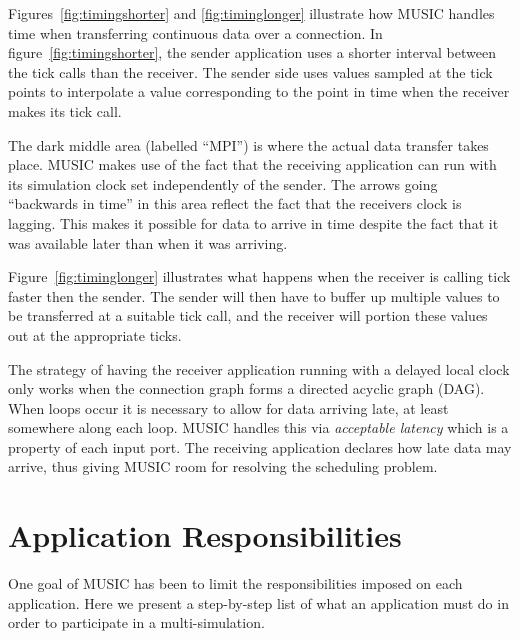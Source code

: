 \documentclass[a4paper]{report}
\begin{document}
Figures~\ref{fig:timingshorter} and \ref{fig:timinglonger} illustrate
how MUSIC handles time when transferring continuous data over a connection.
In figure~\ref{fig:timingshorter}, the sender application uses a
shorter interval between the tick calls than the receiver.  The sender
side uses values sampled at the tick points to interpolate a value
corresponding to the point in time when the receiver makes its tick
call.

The dark middle area (labelled ``MPI'') is where the actual data
transfer takes place.  MUSIC makes use of the fact that the receiving
application can run with its simulation clock set independently of the
sender.  The arrows going ``backwards in time'' in this area reflect
the fact that the receivers clock is lagging.  This makes it possible
for data to arrive in time despite the fact that it was available
later than when it was arriving.

Figure~\ref{fig:timinglonger} illustrates what happens when the
receiver is calling tick faster then the sender.  The sender will then
have to buffer up multiple values to be transferred at a suitable tick
call, and the receiver will portion these values out at the
appropriate ticks.

The strategy of having the receiver application running with a delayed
local clock only works when the connection graph forms a directed
acyclic graph (DAG).
When loops occur it is necessary to allow for data arriving late, at
least somewhere along each loop.  MUSIC handles this via
\emph{acceptable latency}
which is a property of each input port.  The receiving application
declares how late data may arrive, thus giving MUSIC room for
resolving the scheduling problem.


\section{Application Responsibilities}

One goal of MUSIC has been to limit the responsibilities imposed on
each application.  Here we present a step-by-step list of what an
application must do in order to participate in a multi-simulation.
\end{document}
